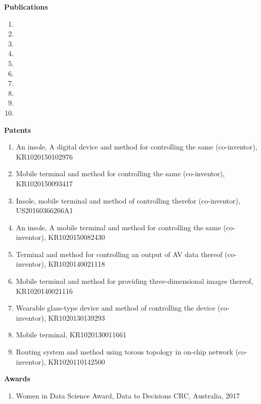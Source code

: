 \documentclass[letterpaper,11pt]{article}
\newcommand{\resheading}[1]{{\large \colorbox{mygrey}{\begin{minipage}{\textwidth}{\textbf{#1 \vphantom{p\^{E}}}}\end{minipage}}}}
\begin{document}
\pagebreak



\resheading{Publications}
    \begin{enumerate}\setlength{\parskip}{0pt}
        	\item {}
        \item {}
    	\item {}
        \item {}
        \item {}
        \item {}
        \item {}
        \item {}
        \item {}
        \item {}
    \end{enumerate}


\resheading{Patents}
    \begin{enumerate}
        \item An insole, A digital device and method for controlling the same (co-inventor), KR1020150102976
        \item Mobile terminal and method for controlling the same (co-inventor), KR1020150093417
        \item Insole, mobile terminal and method of controlling therefor (co-inventor), US20160366266A1
        \item An insole, A mobile terminal and method for controlling the same (co-inventor), KR1020150082430
        \item Terminal and method for controlling an output of AV data thereof (co-inventor), KR1020140021118
        \item Mobile terminal and method for providing three-dimensional images thereof, KR1020140021116
        \item Wearable glass-type device and method of controlling the device (co-inventor), KR1020130139293
        \item Mobile terminal, KR1020130011661
        \item Routing system and method using torous topology in on-chip network (co-inventor), KR1020110142500
    \end{enumerate}

\resheading{Awards}
    \begin{enumerate}
        \item Women in Data Science Award, Data to Decisions CRC, Australia, 2017
    \end{enumerate}
\end{document}
